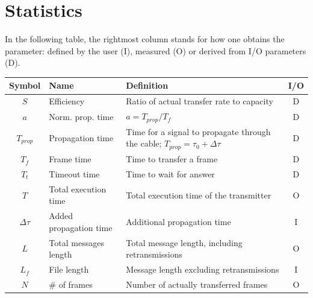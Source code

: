 \documentclass[a4paper, 11pt]{report}
\begin{document}
\chapter{Statistics} \label{ch:statistics}

In the following table, the rightmost column stands for how one obtains the parameter: defined by the user (I), measured (O) or derived from I/O parameters (D).

\begin{center}
	\small
	\begin{tabular}{c | l | p{80mm} | c}
		\hline \hline
		\textbf{Symbol} & \textbf{Name}               & \textbf{Definition}                                                                & I/O \\ \hline
		$S$              & Efficiency                  & Ratio of actual transfer rate to capacity                                          & D   \\
		$a$              & Norm. prop. time            & $a = T_{prop}/T_f$                                                                 & D   \\
		$T_{prop}$       & Propagation time            & Time for a signal to propagate through the cable; $T_{prop} = \tau_0 + \Delta\tau$ & D   \\
		$T_f$            & Frame time                  & Time to transfer a frame                                                           & D   \\
		$T_t$            & Timeout time                & Time to wait for answer                                                            & D   \\
		$T$              & Total execution time        & Total execution time of the transmitter                                            & O   \\
		$\Delta\tau$     & Added propagation time      & Additional propagation time                                                        & I   \\
		$L$              & Total messages length       & Total message length, including retransmissions                                    & O   \\
		$L_f$            & File length                 & Message length excluding retransmissions                                           & I   \\
		$N$				 & \# of frames                & Number of actually transferred frames                                              & O   \\

\end{tabular}
\end{center}
\end{document}
